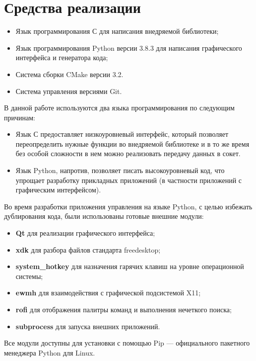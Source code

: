\section{Средства реализации}

\begin{itemize}
	\item Язык программирования С для написания внедряемой библиотеки;
	\item Язык программирования Python версии 3.8.3 для написания графического
		интерфейса и генератора кода;
	\item Система сборки CMake версии 3.2.
	\item Система управления версиями Git.
\end{itemize}

В данной работе используются два языка программирования по следующим причинам:

\begin{itemize}
	\item Язык С предоставляет низкоуровневый интерфейс, который позволяет
		переопределить нужные функции во внедряемой библиотеке и в то же время
		без особой сложности в нем можно реализовать передачу данных в сокет.
	\item Язык Python, напротив, позволяет писать высокоуровневый код, что
		упрощает разработку прикладных приложений (в частности приложений с
		графическим интерфейсом).
\end{itemize}

Во время разработки приложения управления на языке Python, с целью избежать
дублирования кода, были использованы готовые внешние модули:

\begin{itemize}
	\item \textbf{Qt} для реализации графического интерфейса;
	\item \textbf{xdk} для разбора файлов стандарта freedesktop;
	\item \textbf{system\_hotkey} для назначения гарячих клавиш на уровне
		операционной системы;
	\item \textbf{ewmh} для взаимодействия с графической подсистемой X11;
	\item \textbf{rofi} для отображения палитры команд и выполнения нечеткого
		поиска;
	\item \textbf{subprocess} для запуска внешних приложений.
\end{itemize}

Все модули доступны для установки с помощью Pip — официального пакетного
менеджера Python для Linux.

